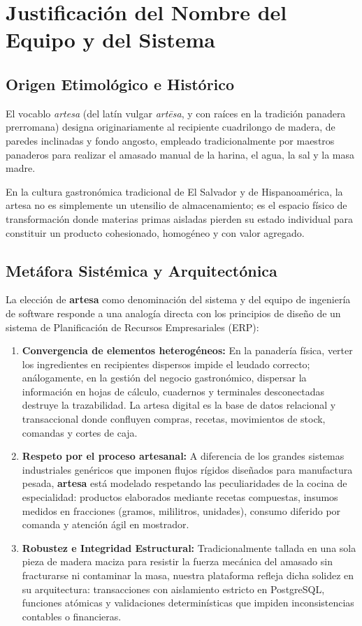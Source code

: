 \section{Justificación del Nombre del Equipo y del Sistema}
\label{sec:justificacion_nombre}

\subsection{Origen Etimológico e Histórico}
El vocablo \textit{artesa} (del latín vulgar \textit{artēsa}, y con raíces en la tradición panadera prerromana) designa originariamente al recipiente cuadrilongo de madera, de paredes inclinadas y fondo angosto, empleado tradicionalmente por maestros panaderos para realizar el amasado manual de la harina, el agua, la sal y la masa madre. 

En la cultura gastronómica tradicional de El Salvador y de Hispanoamérica, la artesa no es simplemente un utensilio de almacenamiento; es el espacio físico de transformación donde materias primas aisladas pierden su estado individual para constituir un producto cohesionado, homogéneo y con valor agregado.

\subsection{Metáfora Sistémica y Arquitectónica}
La elección de \textbf{artesa} como denominación del sistema y del equipo de ingeniería de software responde a una analogía directa con los principios de diseño de un sistema de Planificación de Recursos Empresariales (ERP):

\begin{enumerate}
    \item \textbf{Convergencia de elementos heterogéneos:} En la panadería física, verter los ingredientes en recipientes dispersos impide el leudado correcto; análogamente, en la gestión del negocio gastronómico, dispersar la información en hojas de cálculo, cuadernos y terminales desconectadas destruye la trazabilidad. La artesa digital es la base de datos relacional y transaccional donde confluyen compras, recetas, movimientos de stock, comandas y cortes de caja.
    \item \textbf{Respeto por el proceso artesanal:} A diferencia de los grandes sistemas industriales genéricos que imponen flujos rígidos diseñados para manufactura pesada, \textbf{artesa} está modelado respetando las peculiaridades de la cocina de especialidad: productos elaborados mediante recetas compuestas, insumos medidos en fracciones (gramos, mililitros, unidades), consumo diferido por comanda y atención ágil en mostrador.
    \item \textbf{Robustez e Integridad Estructural:} Tradicionalmente tallada en una sola pieza de madera maciza para resistir la fuerza mecánica del amasado sin fracturarse ni contaminar la masa, nuestra plataforma refleja dicha solidez en su arquitectura: transacciones con aislamiento estricto en PostgreSQL, funciones atómicas y validaciones determinísticas que impiden inconsistencias contables o financieras.
\end{enumerate}

